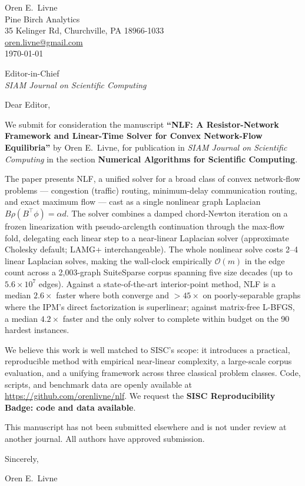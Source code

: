 \documentclass[11pt]{article}
\begin{document}
\noindent
Oren E.\ Livne\\
Pine Birch Analytics\\
35 Kelinger Rd, Churchville, PA 18966-1033\\
\href{mailto:oren.livne@gmail.com}{oren.livne@gmail.com}\\[6pt]
\today

\bigskip
\noindent
Editor-in-Chief\\
\textit{SIAM Journal on Scientific Computing}

\bigskip
\noindent
Dear Editor,

\medskip
We submit for consideration the manuscript \textbf{``NLF: A Resistor-Network Framework and
Linear-Time Solver for Convex Network-Flow Equilibria''} by Oren E.\ Livne, for publication in
\textit{SIAM Journal on Scientific Computing} in the section
\textbf{Numerical Algorithms for Scientific Computing}.

The paper presents NLF, a unified solver for a broad class of convex network-flow problems ---
congestion (traffic) routing, minimum-delay communication routing, and exact maximum flow ---
cast as a single nonlinear graph Laplacian $B\rho(B^{\top}\phi)=\alpha d$.
The solver combines a damped chord-Newton iteration on a frozen linearization with
pseudo-arclength continuation through the max-flow fold, delegating each linear step to a
near-linear Laplacian solver (approximate Cholesky default; LAMG+ interchangeable).
The whole nonlinear solve costs 2--4 linear Laplacian solves, making the wall-clock empirically
$\mathcal{O}(m)$ in the edge count across a 2,003-graph SuiteSparse corpus spanning five size
decades (up to $5.6\times10^7$ edges).
Against a state-of-the-art interior-point method, NLF is a median $2.6\times$ faster where both
converge and $>45\times$ on poorly-separable graphs where the IPM's direct factorization is
superlinear; against matrix-free L-BFGS, a median $4.2\times$ faster and the only solver to
complete within budget on the 90 hardest instances.

We believe this work is well matched to SISC's scope: it introduces a practical, reproducible
method with empirical near-linear complexity, a large-scale corpus evaluation, and a unifying
framework across three classical problem classes.
Code, scripts, and benchmark data are openly available at
\url{https://github.com/orenlivne/nlf}.
We request the \textbf{SISC Reproducibility Badge: code and data available}.

This manuscript has not been submitted elsewhere and is not under review at another journal.
All authors have approved submission.

\bigskip
\noindent
Sincerely,

\bigskip\bigskip
\noindent
Oren E.\ Livne
\end{document}
